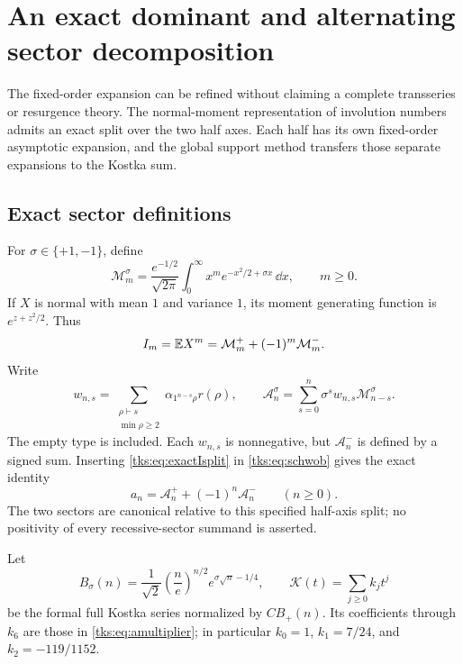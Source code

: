 \section{An exact dominant and alternating sector decomposition}\label{tks:sec:sectors}
The fixed-order expansion can be refined without claiming a complete transseries or resurgence theory. The normal-moment representation of involution numbers admits an exact split over the two half axes. Each half has its own fixed-order asymptotic expansion, and the global support method transfers those separate expansions to the Kostka sum.

\subsection{Exact sector definitions}
For $\sigma\in\{+1,-1\}$, define
\begin{equation}\label{tks:eq:halfaxis}
\mathcal M_m^\sigma=\frac{e^{-1/2}}{\sqrt{2\pi}}
 \int_0^\infty x^m e^{-x^2/2+\sigma x}\,\dd x,
\qquad m\geq0.
\end{equation}
If $X$ is normal with mean $1$ and variance $1$, its moment generating function is $e^{z+z^2/2}$. Thus
\begin{equation}\label{tks:eq:exactIsplit}
I_m=\mathbb E X^m=\mathcal M_m^++(-1)^m\mathcal M_m^-.
\end{equation}
Write
\[
w_{n,s}=\sum_{\substack{\rho\vdash s\\\min\rho\geq2}}
                \alpha_{1^{n-s}\rho}r(\rho),
\qquad
\mathcal A_n^\sigma=\sum_{s=0}^n\sigma^s w_{n,s}\mathcal M_{n-s}^\sigma.
\]
The empty type is included. Each $w_{n,s}$ is nonnegative, but $\mathcal A_n^-$ is defined by a signed sum. Inserting \eqref{tks:eq:exactIsplit} in \eqref{tks:eq:schwob} gives the exact identity
\begin{equation}\label{tks:eq:exactasplit}
a_n=\mathcal A_n^++(-1)^n\mathcal A_n^-\qquad(n\geq0).
\end{equation}
The two sectors are canonical relative to this specified half-axis split; no positivity of every recessive-sector summand is asserted.

Let
\[
B_\sigma(n)=\frac1{\sqrt2}\left(\frac ne\right)^{n/2}
                          e^{\sigma\sqrt n-1/4},
\qquad
\mathcal K(t)=\sum_{j\geq0}k_jt^j
\]
be the formal full Kostka series normalized by $CB_+(n)$. Its coefficients through $k_6$ are those in \eqref{tks:eq:amultiplier}; in particular $k_0=1$, $k_1=7/24$, and $k_2=-119/1152$.

